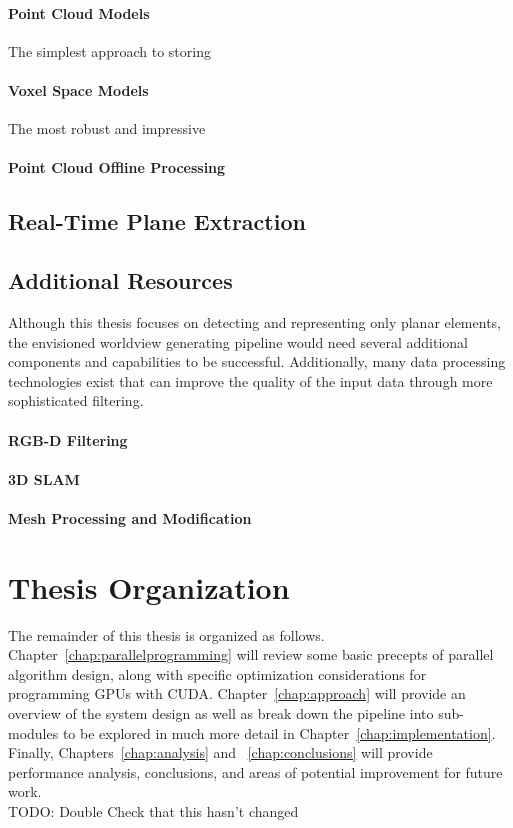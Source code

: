 \paragraph{Point Cloud Models}
The simplest approach to storing 
\paragraph{Voxel Space Models}
The most robust and impressive 
\paragraph{Point Cloud Offline Processing}
\subsection{Real-Time Plane Extraction}

\subsection{Additional Resources}
Although this thesis focuses on detecting and representing only planar elements, the envisioned worldview generating pipeline would need several additional components and capabilities to be successful. Additionally, many data processing technologies exist that can improve the quality of the input data through more sophisticated filtering.
\paragraph{RGB-D Filtering}
\paragraph{3D SLAM}
\paragraph{Mesh Processing and Modification}
\section{Thesis Organization} %
The remainder of this thesis is organized as follows. Chapter~\ref{chap:parallelprogramming} will review some basic precepts of parallel algorithm design, along with specific optimization considerations for programming GPUs with CUDA. Chapter~\ref{chap:approach} will provide an overview of the system design as well as break down the pipeline into sub-modules to be explored in much more detail in Chapter~\ref{chap:implementation}. Finally, Chapters~\ref{chap:analysis} and ~\ref{chap:conclusions} will provide performance analysis, conclusions, and areas of potential improvement for future work.\\
{\color{red} TODO: Double Check that this hasn't changed}